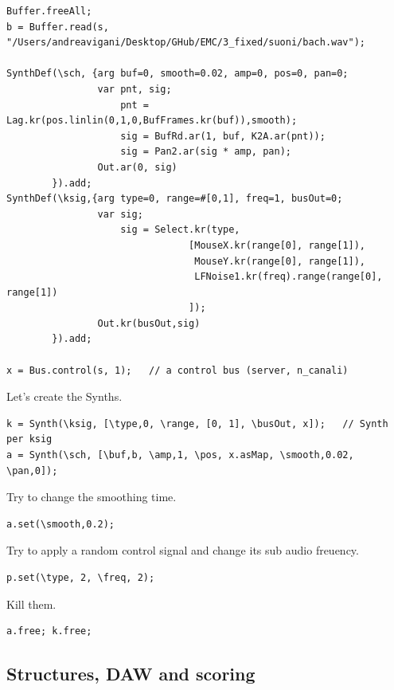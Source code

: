 \begin{lstlisting}[frame=single] 
Buffer.freeAll;
b = Buffer.read(s, "/Users/andreavigani/Desktop/GHub/EMC/3_fixed/suoni/bach.wav");

SynthDef(\sch, {arg buf=0, smooth=0.02, amp=0, pos=0, pan=0;
                var pnt, sig;
                    pnt = Lag.kr(pos.linlin(0,1,0,BufFrames.kr(buf)),smooth);
                    sig = BufRd.ar(1, buf, K2A.ar(pnt));
                    sig = Pan2.ar(sig * amp, pan);
                Out.ar(0, sig)
        }).add;
SynthDef(\ksig,{arg type=0, range=#[0,1], freq=1, busOut=0;
	            var sig;
	                sig = Select.kr(type,
                                [MouseX.kr(range[0], range[1]),
                                 MouseY.kr(range[0], range[1]),
                                 LFNoise1.kr(freq).range(range[0], range[1])
                                ]);
	            Out.kr(busOut,sig)
        }).add;

x = Bus.control(s, 1);   // a control bus (server, n_canali)
\end{lstlisting}

Let's create the Synths.

\begin{lstlisting}[frame=single] 
k = Synth(\ksig, [\type,0, \range, [0, 1], \busOut, x]);   // Synth per ksig
a = Synth(\sch, [\buf,b, \amp,1, \pos, x.asMap, \smooth,0.02, \pan,0]);
\end{lstlisting}

Try to change the smoothing time.

\begin{lstlisting}[frame=single] 
a.set(\smooth,0.2);
\end{lstlisting}

Try to apply a random control signal and change its sub audio freuency.

\begin{lstlisting}[frame=single] 
p.set(\type, 2, \freq, 2);
\end{lstlisting}

Kill them.

\begin{lstlisting}[frame=single] 
a.free; k.free;
\end{lstlisting}

\subsection{Structures, DAW and scoring}\label{structures-daw-and-scoring}

